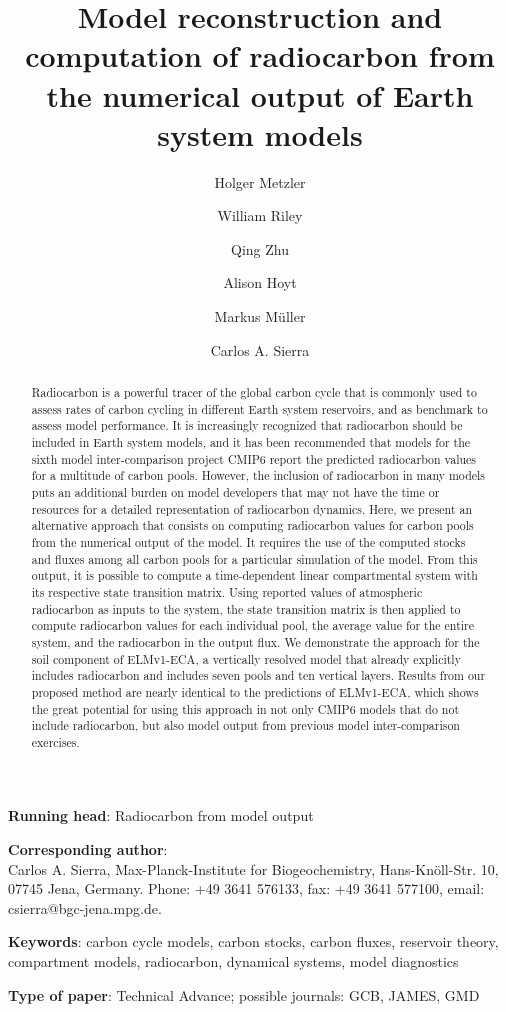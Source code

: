 \documentclass[11pt,a4paper]{article}
\title{\bf Model reconstruction and computation of radiocarbon from the numerical output of Earth system models}
\author[1]{Holger Metzler}
\author[2]{William Riley}
\author[2]{Qing Zhu}
\author[1]{Alison Hoyt}
\author[1]{Markus M\"uller}
\author[1]{Carlos A. Sierra}
\affil[1]{\it \small Max Planck Institute for Biogeochemistry, Hans-Kn\"oll-Str. 10, 07745 Jena, Germany}
\affil[2]{\it Climate and Ecosystem Sciences Division, Lawrence Berkeley National Laboratory, Berkeley 94720, USA}
\date{}
\begin{document}
\doublespace
\maketitle

\noindent
{\bf Running head}: Radiocarbon from model output

\vspace{2em}

\noindent
\textbf{Corresponding author}: \\ Carlos A. Sierra, Max-Planck-Institute for Biogeochemistry, Hans-Kn\"{o}ll-Str. 10, 07745 Jena, Germany. Phone: +49 3641 576133, fax: +49 3641 577100, email: csierra@bgc-jena.mpg.de.

\vspace{2em}

\noindent
{\bf Keywords}: carbon cycle models, carbon stocks, carbon fluxes, reservoir theory, compartment models, radiocarbon, dynamical systems,  model diagnostics

\vspace{2em}

\noindent
{\bf Type of paper}: Technical Advance; possible journals: GCB, JAMES, GMD
\newpage
\linenumbers

\begin{abstract}
Radiocarbon is a powerful tracer of the global carbon cycle that is commonly used to assess rates of carbon cycling in different Earth system reservoirs, and as benchmark to assess model performance. It is increasingly recognized that radiocarbon should be included in Earth system models, and it has been recommended that models for the sixth model inter-comparison project CMIP6 report the predicted radiocarbon values for a multitude of carbon pools. However, the inclusion of radiocarbon in many models puts an additional burden on model developers that may not have the time or resources for a detailed representation of radiocarbon dynamics. Here, we present an alternative approach that consists on computing radiocarbon values for carbon pools from the numerical output of the model. It requires the use of the computed stocks and fluxes among all carbon pools for a particular simulation of the model. From this output, it is possible to compute a time-dependent linear compartmental system with its respective state transition matrix. Using reported values of atmospheric radiocarbon as inputs to the system, the state transition matrix is then applied to compute radiocarbon values for each individual pool, the average value for the entire system, and the radiocarbon in the output flux. 
We demonstrate the approach for the soil component of ELMv1-ECA, a vertically resolved model that already explicitly includes radiocarbon and includes seven pools and ten vertical layers. Results from our proposed method are nearly identical to the predictions of ELMv1-ECA, which shows the great potential for using this approach in not only CMIP6 models that do not include radiocarbon, but also model output from previous model inter-comparison exercises. 
\end{abstract}
\end{document}
